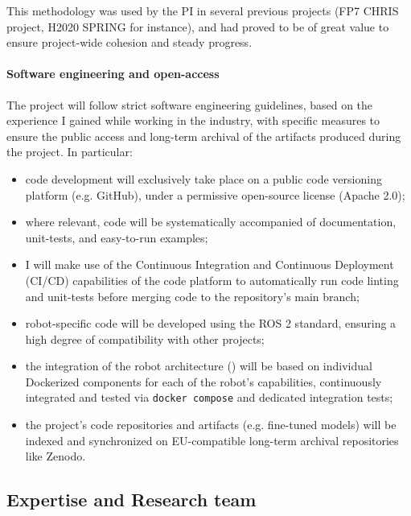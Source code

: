 This methodology was used by the PI in  several previous projects (FP7 CHRIS
project, H2020 SPRING for instance), and had proved to be of great value to
ensure project-wide cohesion and steady progress.

\paragraph{Software engineering and open-access}

The project will follow strict software engineering guidelines, based on the
experience I gained while working in the industry, with specific measures to
ensure the public access and long-term archival of the artifacts produced during
the project. In particular:

\begin{itemize}
    \item code development will exclusively take place on a public code versioning
        platform (e.g. GitHub), under a permissive open-source license (Apache
        2.0);
    \item where relevant, code will be systematically accompanied of
        documentation, unit-tests, and easy-to-run examples;
    \item I will make use of the Continuous Integration and Continuous
        Deployment (CI/CD) capabilities of the code platform to automatically
        run code linting and unit-tests before merging code to the repository's
        main branch;
    \item robot-specific code will be developed using the ROS 2 standard,
        ensuring a high degree of compatibility with other projects;
    \item the integration of the robot architecture (\tCC) will be based on individual Dockerized
        components for each of the robot's capabilities, continuously integrated
        and tested via \texttt{docker compose} and dedicated integration tests;
    \item the project's code repositories and artifacts (e.g. fine-tuned models)
        will be indexed and synchronized on EU-compatible long-term archival
        repositories like Zenodo.  
\end{itemize}

\subsection{Expertise and Research team}
\label{research-team}

